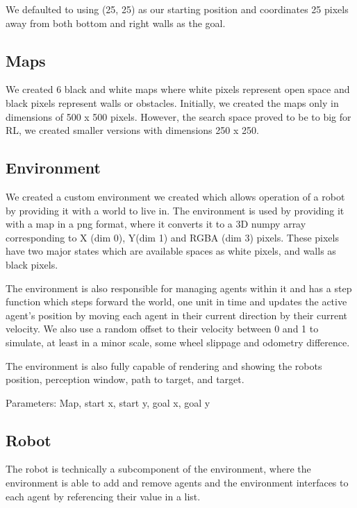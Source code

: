 \documentclass[11pt]{article}
\begin{document}

    We defaulted to using (25, 25) as our starting position and coordinates 25 pixels away from both bottom and right walls as the goal.

    \subsection{Maps}

    We created 6 black and white maps where white pixels represent open space
    and black pixels represent walls or obstacles. Initially, we created the
    maps only in dimensions of 500 x 500 pixels. However, the search space
    proved to be to big for RL, we created smaller versions with dimensions 250
    x 250.
    
    \subsection{Environment}
    We created a custom environment we created which allows operation of a robot by providing it with a world to live in. The environment is used by providing it with a map in a png format, where it converts it to a 3D numpy array corresponding to X (dim 0), Y(dim 1) and RGBA (dim 3) pixels. These pixels have two major states which are available spaces as white pixels, and walls as black pixels. 

    The environment is also responsible for managing agents within it and has a step function which steps forward the world, one unit in time and updates the active agent's position by moving each agent in their current direction by their current velocity. We also use a random offset to their velocity between 0 and 1 to simulate, at least in a minor scale, some wheel slippage and odometry difference. 

    The environment is also fully capable of rendering and showing the robots position, perception window, path to target, and target.

    Parameters: Map, start x, start y, goal x, goal y

    \subsection{Robot}
    The robot is technically a subcomponent of the environment, where the environment is able to add and remove agents and the environment interfaces to each agent by referencing their value in a list.
\end{document}
